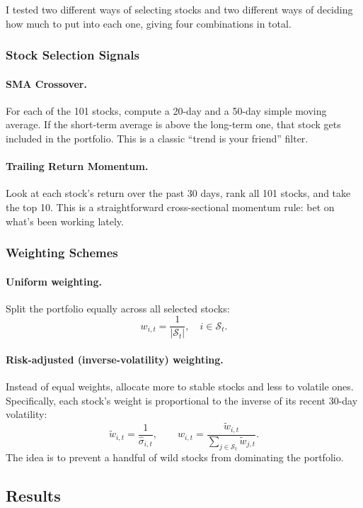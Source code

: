 \documentclass[11pt,a4paper]{article}
\begin{document}
I tested two different ways of selecting stocks and two different ways
of deciding how much to put into each one, giving four combinations in total.

\subsubsection{Stock Selection Signals}

\paragraph{SMA Crossover.}
For each of the 101 stocks, compute a 20-day and a 50-day simple moving average.
If the short-term average is above the long-term one, that stock gets included in
the portfolio. This is a classic ``trend is your friend'' filter.

\paragraph{Trailing Return Momentum.}
Look at each stock's return over the past 30 days, rank all 101 stocks,
and take the top 10.
This is a straightforward cross-sectional momentum rule: bet on what's been
working lately.

\subsubsection{Weighting Schemes}

\paragraph{Uniform weighting.}
Split the portfolio equally across all selected stocks:
\[
w_{i,t} = \frac{1}{|\mathcal{S}_t|}, \quad i \in \mathcal{S}_t.
\]

\paragraph{Risk-adjusted (inverse-volatility) weighting.}
Instead of equal weights, allocate more to stable stocks and less to volatile ones.
Specifically, each stock's weight is proportional to the inverse of its recent
30-day volatility:
\[
\tilde{w}_{i,t} = \frac{1}{\hat{\sigma}_{i,t}}, \qquad
w_{i,t} = \frac{\tilde{w}_{i,t}}{\sum_{j \in \mathcal{S}_t} \tilde{w}_{j,t}}.
\]
The idea is to prevent a handful of wild stocks from dominating the portfolio.

\subsection{Results}
\end{document}
